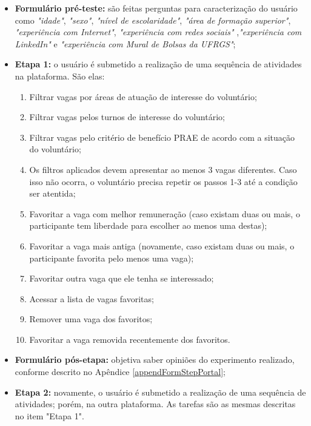 \begin{itemize}
    \item \textbf{Formulário pré-teste:} são feitas perguntas para caracterização do usuário como \textit{"idade"}, \textit{"sexo"}, \textit{"nível de escolaridade"}, \textit{"área de formação superior"}, \textit{"experiência com Internet"}, \textit{"experiência com redes sociais"} ,\textit{"experiência com LinkedIn"} e \textit{"experiência com Mural de Bolsas da UFRGS"};
    
    \item \textbf{Etapa 1:} o usuário é submetido a realização de uma sequência de atividades na plataforma. São elas:
        \begin{enumerate}
            \item Filtrar vagas por áreas de atuação de interesse do voluntário;
            \item Filtrar vagas pelos turnos de interesse do voluntário;
            \item Filtrar vagas pelo critério de benefício PRAE de acordo com a situação do voluntário;
            \item Os filtros aplicados devem apresentar ao menos 3 vagas diferentes. Caso isso não ocorra, o voluntário precisa repetir os passos 1-3 até a condição ser atentida;
            \item Favoritar a vaga com melhor remuneração (caso existam duas ou mais, o participante tem liberdade para escolher ao menos uma destas);
            \item Favoritar a vaga mais antiga (novamente, caso existam duas ou mais, o participante favorita pelo menos uma vaga);
            \item Favoritar outra vaga que ele tenha se interessado;
            \item Acessar a lista de vagas favoritas;
            \item Remover uma vaga dos favoritos;
            \item Favoritar a vaga removida recentemente dos favoritos.
        \end{enumerate}
        
    \item \textbf{Formulário pós-etapa:} objetiva saber opiniões do experimento realizado, conforme descrito no Apêndice \ref{appendFormStepPortal};
    
    \item \textbf{Etapa 2:} novamente, o usuário é submetido a realização de uma sequência de atividades; porém, na outra plataforma. As tarefas são as mesmas descritas no item "Etapa 1".
        

\end{itemize}

